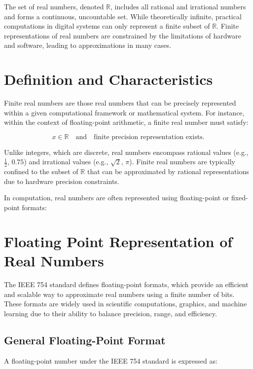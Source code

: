 The set of real numbers, denoted \( \mathbb{R} \), includes all rational and irrational numbers and forms a continuous, uncountable set. While theoretically infinite, practical computations in digital systems can only represent a finite subset of \( \mathbb{R} \). Finite representations of real numbers are constrained by the limitations of hardware and software, leading to approximations in many cases. 

\section{Definition and Characteristics}

Finite real numbers are those real numbers that can be precisely represented within a given computational framework or mathematical system. For instance, within the context of floating-point arithmetic, a finite real number must satisfy:

\[
x \in \mathbb{R} \quad \text{and} \quad \text{finite precision representation exists}.
\]

Unlike integers, which are discrete, real numbers encompass rational values (e.g., \( \frac{1}{2} \), \( 0.75 \)) and irrational values (e.g., \( \sqrt{2} \), \( \pi \)). Finite real numbers are typically confined to the subset of \( \mathbb{R} \) that can be approximated by rational representations due to hardware precision constraints.

In computation, real numbers are often represented using floating-point or fixed-point formats:

\section{Floating Point Representation of Real Numbers}

The IEEE 754 standard defines floating-point formats, which provide an efficient and scalable way to approximate real numbers using a finite number of bits. These formats are widely used in scientific computations, graphics, and machine learning due to their ability to balance precision, range, and efficiency.

\subsection{General Floating-Point Format}
A floating-point number under the IEEE 754 standard \cite{ieee2008} is expressed as:

